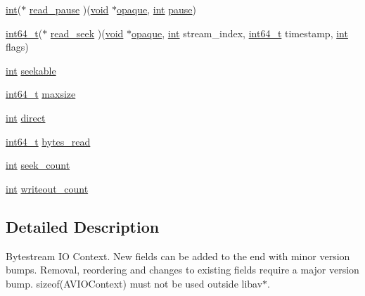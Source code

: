 \begin{DoxyCompactItemize}
\item 
\hyperlink{xmltok_8h_a5a0d4a5641ce434f1d23533f2b2e6653}{int}($\ast$ \hyperlink{struct_a_v_i_o_context_ae3658a91428df0cfa2b834f6bd7d7bd4}{read\+\_\+pause} )(\hyperlink{sound_8c_ae35f5844602719cf66324f4de2a658b3}{void} $\ast$\hyperlink{struct_a_v_i_o_context_afa97c079a10a48588f7b55f9dfff1e47}{opaque}, \hyperlink{xmltok_8h_a5a0d4a5641ce434f1d23533f2b2e6653}{int} \hyperlink{winmain2_8h_aef3a6553bfd1b1958085c0ea353c0fa8}{pause})
\item 
\hyperlink{lib-src_2ffmpeg_2win32_2stdint_8h_a67a9885ef4908cb72ce26d75b694386c}{int64\+\_\+t}($\ast$ \hyperlink{struct_a_v_i_o_context_ac2e538dd7f6a73cbc77e6ffdf3f11882}{read\+\_\+seek} )(\hyperlink{sound_8c_ae35f5844602719cf66324f4de2a658b3}{void} $\ast$\hyperlink{struct_a_v_i_o_context_afa97c079a10a48588f7b55f9dfff1e47}{opaque}, \hyperlink{xmltok_8h_a5a0d4a5641ce434f1d23533f2b2e6653}{int} stream\+\_\+index, \hyperlink{lib-src_2ffmpeg_2win32_2stdint_8h_a67a9885ef4908cb72ce26d75b694386c}{int64\+\_\+t} timestamp, \hyperlink{xmltok_8h_a5a0d4a5641ce434f1d23533f2b2e6653}{int} flags)
\item 
\hyperlink{xmltok_8h_a5a0d4a5641ce434f1d23533f2b2e6653}{int} \hyperlink{struct_a_v_i_o_context_a0e3c41c290b38923880b9cccb669bf78}{seekable}
\item 
\hyperlink{lib-src_2ffmpeg_2win32_2stdint_8h_a67a9885ef4908cb72ce26d75b694386c}{int64\+\_\+t} \hyperlink{struct_a_v_i_o_context_a33e387aeb28b7a352c62ba8c30a214e7}{maxsize}
\item 
\hyperlink{xmltok_8h_a5a0d4a5641ce434f1d23533f2b2e6653}{int} \hyperlink{struct_a_v_i_o_context_af719be70947f5f8eebaa5f8ac58fd306}{direct}
\item 
\hyperlink{lib-src_2ffmpeg_2win32_2stdint_8h_a67a9885ef4908cb72ce26d75b694386c}{int64\+\_\+t} \hyperlink{struct_a_v_i_o_context_a2685da68190c842c028ec161ff2b563e}{bytes\+\_\+read}
\item 
\hyperlink{xmltok_8h_a5a0d4a5641ce434f1d23533f2b2e6653}{int} \hyperlink{struct_a_v_i_o_context_a38b3c122a21fc2271e3174342e87a79f}{seek\+\_\+count}
\item 
\hyperlink{xmltok_8h_a5a0d4a5641ce434f1d23533f2b2e6653}{int} \hyperlink{struct_a_v_i_o_context_ac027eace34bf1dbcab5f71b0806d1c8a}{writeout\+\_\+count}
\end{DoxyCompactItemize}


\subsection{Detailed Description}
Bytestream IO Context. New fields can be added to the end with minor version bumps. Removal, reordering and changes to existing fields require a major version bump. sizeof(\+A\+V\+I\+O\+Context) must not be used outside libav$\ast$.


